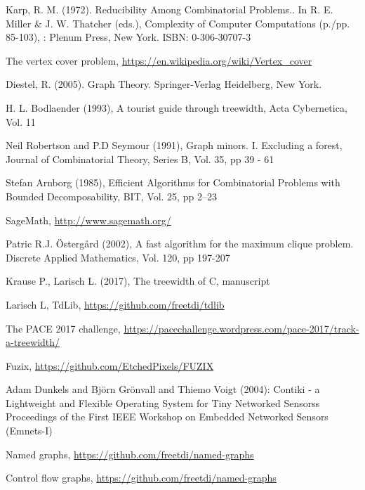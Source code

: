 \documentclass[11pt,a4paper]{article}
\begin{document}


\begin{thebibliography}{9}

 Karp, R. M. (1972). Reducibility Among Combinatorial Problems.. In R. E. Miller \& J. W. Thatcher (eds.), Complexity of Computer Computations (p./pp. 85-103), : Plenum Press, New York. ISBN: 0-306-30707-3

 The vertex cover problem, \url{https://en.wikipedia.org/wiki/Vertex_cover}

 Diestel, R. (2005). Graph Theory. Springer-Verlag Heidelberg, New York. 

 H. L. Bodlaender (1993), A tourist guide through treewidth, Acta Cybernetica, Vol. 11

 Neil Robertson and P.D Seymour (1991), Graph minors. I. Excluding a forest, Journal of Combinatorial Theory, Series B, Vol. 35, pp 39 - 61

 Stefan Arnborg (1985), Efficient Algorithms for Combinatorial Problems with Bounded Decomposability, BIT, Vol. 25, pp 2--23

 SageMath, \url{http://www.sagemath.org/}

 Patric R.J. Östergård (2002), A fast algorithm for the maximum clique problem. Discrete Applied Mathematics, Vol. 120, pp 197-207

 Krause P., Larisch L. (2017), The treewidth of C, manuscript

 Larisch L, TdLib, \url{https://github.com/freetdi/tdlib}

 The PACE 2017 challenge, \url{https://pacechallenge.wordpress.com/pace-2017/track-a-treewidth/}

 Fuzix, \url{https://github.com/EtchedPixels/FUZIX}

 Adam Dunkels and Björn Grönvall and Thiemo Voigt (2004): Contiki - a Lightweight and Flexible Operating System for Tiny Networked Sensorss Proceedings of the First IEEE Workshop on Embedded Networked Sensors (Emnets-I)

 Named graphs, \url{https://github.com/freetdi/named-graphs}

 Control flow graphs, \url{https://github.com/freetdi/named-graphs}


\end{thebibliography}
\end{document}
